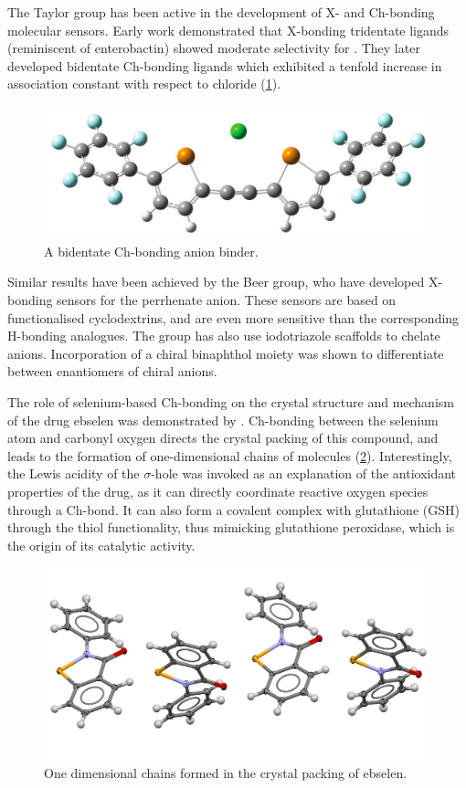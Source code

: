 \begin{refsection}
The Taylor group has been active in the development of X- and Ch-bonding molecular sensors.
Early work demonstrated that X-bonding tridentate ligands (reminiscent of enterobactin) showed moderate selectivity for .\autocite{Dimitrijevic2010}
They later developed bidentate Ch-bonding ligands which exhibited a tenfold increase in association constant with respect to chloride (\cref{fig:taylor-cl-binder}).\autocite{Garrett2015a,Garrett2016}

\begin{figure}
    \centering
    \includegraphics[width=0.6\linewidth]{Figures/taylor-cl-binder.pdf}
    \caption[A bidentate Ch-bonding anion binder.]{A bidentate Ch-bonding anion binder.\autocite{Garrett2016}}\label{fig:taylor-cl-binder}
\end{figure}

Similar results have been achieved by the Beer group, who have developed X-bonding sensors for the perrhenate anion.\autocite{Cornes2017}
These sensors are based on functionalised cyclodextrins, and are even more sensitive than the corresponding H-bonding analogues.
The group has also use iodotriazole scaffolds to chelate anions.\autocite{Borissov2017}
Incorporation of a chiral binaphthol moiety was shown to differentiate between enantiomers of chiral anions.

The role of selenium-based Ch-bonding on the crystal structure and mechanism of the drug ebselen was demonstrated by \citeauthor{Thomas2015}.\autocite{Thomas2015}
Ch-bonding between the selenium atom and carbonyl oxygen directs the crystal packing of this compound, and leads to the formation of one-dimensional chains of molecules (\cref{fig:ebs-packing}).
Interestingly, the Lewis acidity of the $ \sigma $-hole was invoked as an explanation of the antioxidant properties of the drug, as it can directly coordinate reactive oxygen species through a Ch-bond.
It can also form a covalent complex with glutathione (GSH) through the thiol functionality, thus mimicking glutathione peroxidase, which is the origin of its catalytic activity.\autocite{Azad2014}

\begin{figure}
    \centering
    \includegraphics[width=0.7\linewidth]{Figures/ebs-packing.pdf}
    \caption{One dimensional chains formed in the crystal packing of ebselen.}\label{fig:ebs-packing}
\end{figure}


\end{refsection}
